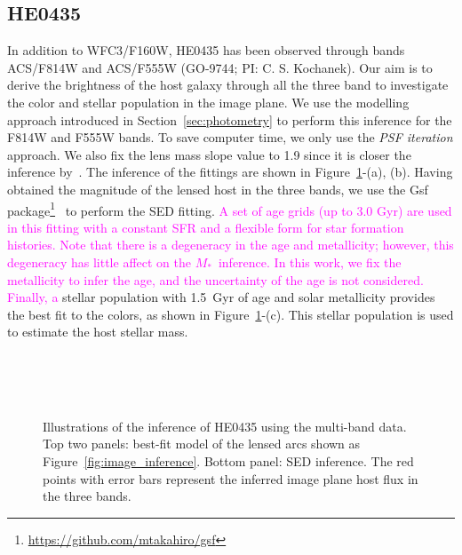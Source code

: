 \documentclass[fleqn,usenatbib]{mnras}
\newcommand{\mstar}{{$M_*$}}
\newcommand{\pink}[1]{{\textcolor{magenta}{#1}}}
\begin{document}
\subsection{HE0435}\label{app:HE0435}
In addition to WFC3/F160W, HE0435 has been observed through bands ACS/F814W and ACS/F555W (GO-9744; PI: C. S. Kochanek). Our aim is to derive the brightness of the host galaxy through all the three band to investigate the color and stellar population in the image plane. We use the modelling approach introduced in Section~\ref{sec:photometry} to perform this inference for the F814W and F555W bands. To save computer time, we only use the {\it PSF iteration} approach. We also fix the lens mass slope value to 1.9 since it is closer the inference by~\citet[][i.e., $\gamma\sim1.93$]{Wong2017}. The inference of the fittings are shown in Figure~\ref{fig:app_HE0435}-(a), (b). Having obtained the magnitude of the lensed host in the three bands, we use the {\sc Gsf} package\footnote{\url{https://github.com/mtakahiro/gsf}}~\citep{Morishita2019} to perform the SED fitting. \pink{A set of age grids (up to 3.0 Gyr) are used in this fitting with a constant SFR and a flexible form for star formation histories. Note that there is a degeneracy in the age and metallicity; however, this degeneracy has little affect on the \mstar\ inference. In this work, we fix the metallicity to infer the age, and the uncertainty of the age is not considered. Finally, a} stellar population with 1.5~Gyr of age and solar metallicity provides the best fit to the colors, as shown in Figure~\ref{fig:app_HE0435}-(c). This stellar population is used to estimate the host stellar mass.


\begin{figure}
\centering
{}\\
\\
\\
\caption{\label{fig:app_HE0435} 
Illustrations of the inference of HE0435 using the multi-band data. Top two panels: best-fit model of the lensed arcs shown as Figure~\ref{fig:image_inference}. Bottom panel: SED inference. The red points with error bars represent the inferred image plane host flux in the three bands.}
\end{figure} 
\end{document}
